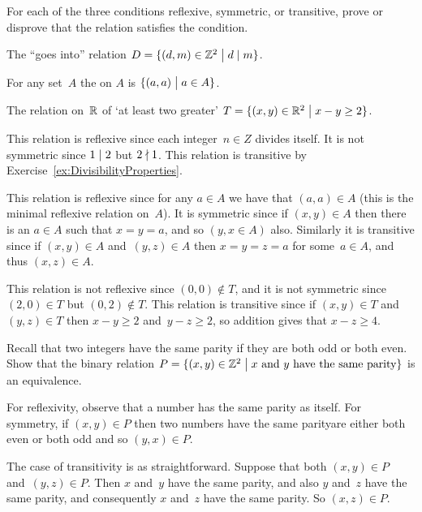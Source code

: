 \documentclass{ibl}  %
\begin{document}
\begin{ex} For each of the three conditions reflexive, symmetric, 
  or transitive,
  prove or disprove that the relation satisfies the condition.
\begin{exes}
\item The ``goes into'' relation
  $D=\{(d,m)\in\mathbb{Z}^2 \bigm| d\mid m\}$.
\item
  For any set~$A$ the  on $A$ 
  is $\{(a,a) \bigm| a\in A\}$. 
\item
  The relation on~$\mathbb{R}$ of `at least two greater'
  $T=\{(x,y)\in \mathbb{R}^2 \bigm| x-y\geq 2\}$.
\end{exes}
\begin{ans}
\begin{exes}
\item This relation is reflexive since each integer~$n\in Z$ 
  divides itself.
  It is not symmetric since $1\mid 2$ but $2\nmid 1$.
  This relation is transitive by Exercise~\ref{ex:DivisibilityProperties}.
\item This relation is reflexive since for any $a\in A$ we have that
  $(a,a)\in A$ (this is the minimal reflexive relation on~$A$).
  It is symmetric since if $(x,y)\in A$ then there is an
  $a\in A$ such that $x=y=a$, and so $(y,x\in A)$ also.
  Similarly it is transitive since if 
  $(x,y)\in A$ and~$(y,z)\in A$ then $x=y=z=a$ for some~$a\in A$, and
  thus $(x,z)\in A$.
\item This relation is not reflexive since $(0,0)\notin T$,
  and it is not symmetric since $(2,0)\in T$ but 
  $(0,2)\notin T$.
  This relation is transitive since if $(x,y)\in T$ and $(y,z)\in T$ 
  then $x-y\geq 2$ and~$y-z\geq 2$, so addition gives that $x-z\geq 4$.
\end{exes}
\end{ans}
\end{ex}

\begin{ex}
Recall that two integers have the same parity if they are both odd or 
both even.
Show that the binary relation 
$P=\{(x,y)\in\mathbb{Z}^2 \bigm| \text{$x$ and $y$ have the same parity}\}$  
is an equivalence.
\begin{ans}
For reflexivity, observe that a number has the same parity as itself.
For symmetry, if $(x,y)\in P$ then
two numbers have the same parity\Dash are either both even or both odd\Dash
and so $(y,x)\in P$.

The case of transitivity is as straightforward.
Suppose that both $(x,y)\in P$ and~$(y,z)\in P$.
Then $x$ and~$y$ have the same parity, and also $y$ and~$z$ have the same
parity, and consequently $x$ and~$z$ have the same parity.
So $(x,z)\in P$.  
\end{ans}
\end{ex}
\end{document}
